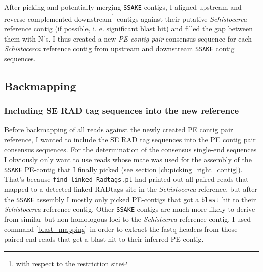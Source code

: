 \documentclass[a4paper,12pt,times,print,index, custombib]{PhDThesisPSnPDF}\usepackage[]{graphicx}\usepackage[]{color}
\begin{document}
After picking and potentially merging \texttt{SSAKE} contigs, I aligned upstream and reverse complemented downstream\footnote{with respect to the restriction site} contigs against their putative \textit{Schistocerca} reference contig (if possible, i. e. significant blast hit) and filled the gap between them with N's. I thus created a new \emph{PE contig pair} consensus sequence for each \textit{Schistocerca} reference contig from upstream and downstream \texttt{SSAKE} contig sequences. 

\FloatBarrier
\subsection{Backmapping}\label{ch:Backmapping}

\subsubsection{Including SE RAD tag sequences into the new reference}

Before backmapping of all reads against the newly created PE contig pair reference, I wanted to include the SE \gls{RAD tag} sequences into the PE contig pair consensus sequences. For the determination of the consensus single-end sequences I obviously only want to use reads whose mate was used for the assembly of the \texttt{SSAKE} PE-contig that I finally picked (see section \ref{ch:picking_right_contig}). That's because \texttt{find\_linked\_Radtags.pl} had printed out all paired reads that mapped to a detected linked RADtags site in the \textit{Schistocerca} reference, but after the \texttt{SSAKE} assembly I mostly only picked PE-contigs that got a \texttt{blast} hit to their \textit{Schistocerca} reference contig. Other \texttt{SSAKE} contigs are much more likely to derive from similar but non-homologous loci to the \textit{Schistcerca} reference contig. I used command \ref{blast_mapping} in order to extract the fastq headers from those paired-end reads that get a blast hit to their inferred PE contig.
\end{document}
